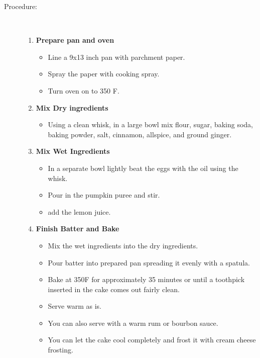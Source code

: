 \documentclass [11pt, letterpaper] {article}
\begin{document}
\begin{description}
\item[Procedure:]\ \\
	\begin{enumerate}
	\item {\bf Prepare pan and oven}
	\begin{itemize}
	\item  Line a 9x13 inch pan with parchment paper. 
	\item Spray the paper with cooking spray.
	\item Turn oven on to 350 F.
	\end{itemize}
	\item {\bf Mix Dry ingredients}
	\begin{itemize}
	\item Using a clean whisk, in a large bowl mix flour, sugar, baking soda, baking powder, salt, cinnamon, allspice, and ground ginger.
	\end{itemize}
	\item {\bf Mix Wet Ingredients}
	\begin{itemize}
        		\item In a separate bowl lightly beat the eggs with the oil using the whisk.
		\item Pour in the pumpkin puree and stir.
		\item add the lemon juice.
	\end{itemize}
	\item {\bf Finish Batter and Bake}
	\begin{itemize}
	\item Mix the wet ingredients into the dry ingredients.
	\item Pour batter into prepared pan spreading it evenly with a spatula.
	\item Bake at 350F for approximately 35 minutes or until a toothpick inserted in the cake comes out fairly clean.
	\item Serve warm as is.
	\item You can also serve with a warm rum or bourbon sauce.
	\item You can let the cake cool completely and frost it with cream cheese frosting.
 	\end{itemize}
     	\end{enumerate}         
\end{description}
\end{document}
